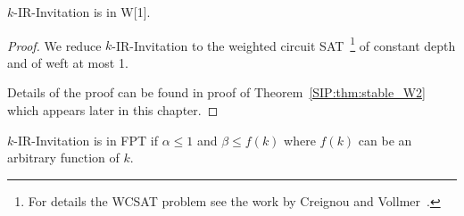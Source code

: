 \begin{theorem} \label{SIP:thm:IR_invitation_W1}
	$k$-IR-Invitation is in W[1].
\end{theorem} 
\begin{proof}
	We reduce $k$-IR-Invitation to the weighted circuit SAT~\footnote{For details the WCSAT problem see the work by Creignou and Vollmer~.} of constant depth and of weft at most 1. 
	
	Details of the proof can be found in proof of Theorem~\ref{SIP:thm:stable_W2} which appears later in this chapter.
\end{proof}


\begin{theorem} \label{SIP:thm:IR_invitation_FPT}
	$k$-IR-Invitation is in FPT if $\alpha \leq 1$ and $\beta \leq f(k)$ where $f(k)$ can be an arbitrary function of $k$. 
\end{theorem}

